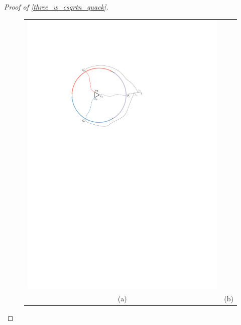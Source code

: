 \documentclass{patmorin}
\begin{document}
\begin{proof}[Proof of \cref{three_w_csqrtn_quack}]
\begin{figure}
\begin{tabular}{cc}
      \includegraphics[page=2]{figs/second_case} \\
      (a) & (b) \\

\end{tabular}
\end{figure}
\end{proof}
\end{document}
